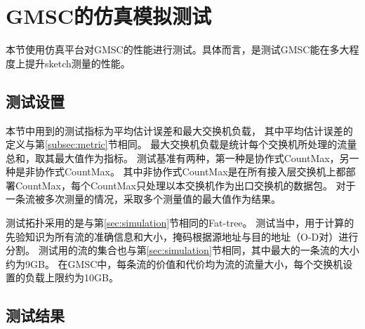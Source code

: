 \section{GMSC的仿真模拟测试}
本节使用仿真平台对GMSC的性能进行测试。具体而言，是测试GMSC能在多大程度上提升sketch测量的性能。

\subsection{测试设置}
本节中用到的测试指标为平均估计误差和最大交换机负载，
其中平均估计误差的定义与第\ref{subsec:metric}节相同。
最大交换机负载是统计每个交换机所处理的流量总和，取其最大值作为指标。
测试基准有两种，第一种是协作式CountMax，另一种是非协作式CountMax。
其中非协作式CountMax是在所有接入层交换机上都部署CountMax，每个CountMax只处理以本交换机作为出口交换机的数据包。
对于一条流被多次测量的情况，采取多个测量值的最大值作为结果。

测试拓扑采用的是与第\ref{sec:simulation}节相同的Fat-tree。
测试当中，用于计算的先验知识为所有流的准确信息和大小，掩码根据源地址与目的地址（O-D对）进行分割。
测试用的流的集合也与第\ref{sec:simulation}节相同，其中最大的一条流的大小约为9GB。
在GMSC中，每条流的价值和代价均为流的流量大小，每个交换机设置的负载上限约为10GB。

\subsection{测试结果}


